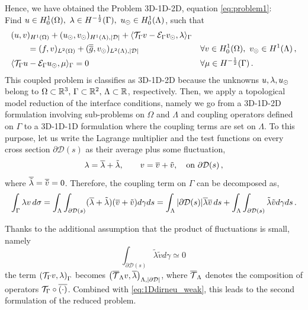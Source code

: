 \documentclass[r]{siamart171218}
\begin{document}
Hence, we have obtained the Problem 3D-1D-2D, equation 
\eqref{eq:problem1}: \\
Find $u \in H^1_0(\Omega), \ \lambda \in H^{-\frac12}(\Gamma ),\ u_{\odot} \in H^1_0(\Lambda)$, such that
\begin{subequations}
\begin{align*}
&(u,v)_{H^1(\Omega)} + (u_{\odot},v_{\odot})_{H^1(\Lambda),|\mathcal{D}|} 
+ \langle {\mathcal{T}_\Gamma} v  - \mathcal{E}_\Gamma v_{\odot}, \lambda \rangle_\Gamma &&
\\
\nonumber
&\qquad= (f,v)_{L^2(\Omega)} +  (\overline{\overline{g}},v_{\odot})_{L^2(\Lambda),|\mathcal{D}|}
\quad &&\forall v \in H^1_0(\Omega), \ v_{\odot} \in H^1(\Lambda)\,,
\\
& \langle {\mathcal{T}_\Gamma} u - \mathcal{E}_\Gamma u_{\odot} , \mu \rangle_\Gamma = 0
\quad && \forall \mu \in H^{-\frac12}(\Gamma)\,.
\end{align*}
\end{subequations}
This coupled problem is classifies as 3D-1D-2D because the unknowns $u,\lambda,u_{\odot}$ belong to 
$\Omega \subset \mathbb{R}^3,\, \Gamma \subset \mathbb{R}^2,\, \Lambda \subset \mathbb{R}$, respectively.
Then, we apply a topological model reduction of the interface conditions, namely we go from a 3D-1D-2D formulation
involving sub-problems on $\Omega$ and $\Lambda$ and coupling operators defined on $\Gamma$
to a 3D-1D-1D formulation where the coupling terms are set on $\Lambda$. 
To this purpose, let us write the Lagrange multiplier and the test functions on every cross section $\partial\mathcal{D}(s)$ as their average plus some fluctuation,
\begin{equation*}
\lambda=\overline{\lambda}+\tilde{\lambda}, \qquad v=\overline{v}+\tilde{v},
\quad \text{on} \ \partial\mathcal{D}(s)\,,
\end{equation*}
where $\overline{\tilde{\lambda}}=\overline{\tilde{v}}=0$. 
Therefore, the coupling term on $\Gamma$ can be decomposed as,
\begin{equation*}
\int_{\Gamma}\lambda v\, d\sigma
=\int _{\Lambda}  \int_{\partial\mathcal{D}(s)} (\overline{\lambda}+\tilde{\lambda})(\overline{v}+\tilde{v})d\gamma ds
= \int_{\Lambda}|\partial\mathcal{D}(s)| \overline{\lambda}\overline{v}\,ds+\int_{\Lambda}  \int_{\partial\mathcal{D}(s)} \tilde{\lambda}\tilde{v}d\gamma ds\,.
\end{equation*}

Thanks to the additional assumption that the product of fluctuations is small, namely
\begin{equation*}
\int_{\partial\mathcal{D}(s)} \tilde{\lambda}\tilde{v} d\gamma \simeq 0\,
\end{equation*}
the term $\left({\mathcal{T}_\Gamma} v, \lambda \right)_{\Gamma}$ becomes $\left( {\overline{\mathcal{T}}_\Lambda} v, \overline{\lambda} \right)_{\Lambda, |\partial\mathcal{D}|}$, where ${\overline{\mathcal{T}}_\Lambda}$ denotes the composition of operators ${\mathcal{T}_\Gamma} \circ \overline{(\cdot)}$.  Combined with \eqref{eq:1Ddirneu_weak}, this leads to the second formulation of the reduced problem.
\end{document}
